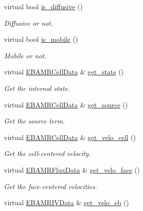 \begin{DoxyCompactItemize}
virtual bool \hyperlink{classcdr__solver_acf2ac6035a00fd145b42ef6565a3a4bb}{is\+\_\+diffusive} ()
\begin{DoxyCompactList}\small\item\em Diffusive or not. \end{DoxyCompactList}\item 
virtual bool \hyperlink{classcdr__solver_ad3e6c13db2bc4681d074112ef59542bf}{is\+\_\+mobile} ()
\begin{DoxyCompactList}\small\item\em Mobile or not. \end{DoxyCompactList}\item 
virtual \hyperlink{type__definitions_8H_a7e610f301989e5e07781c5e338bdb7c3}{E\+B\+A\+M\+R\+Cell\+Data} \& \hyperlink{classcdr__solver_a1e7f6087068cba769fdbe046639ee9ca}{get\+\_\+state} ()
\begin{DoxyCompactList}\small\item\em Get the internal state. \end{DoxyCompactList}\item 
virtual \hyperlink{type__definitions_8H_a7e610f301989e5e07781c5e338bdb7c3}{E\+B\+A\+M\+R\+Cell\+Data} \& \hyperlink{classcdr__solver_ad85c3e1065c64bc3d75007a738ea27a3}{get\+\_\+source} ()
\begin{DoxyCompactList}\small\item\em Get the source term. \end{DoxyCompactList}\item 
virtual \hyperlink{type__definitions_8H_a7e610f301989e5e07781c5e338bdb7c3}{E\+B\+A\+M\+R\+Cell\+Data} \& \hyperlink{classcdr__solver_ab7532eef4d59817755aa26be061494ac}{get\+\_\+velo\+\_\+cell} ()
\begin{DoxyCompactList}\small\item\em Get the cell-\/centered velocity. \end{DoxyCompactList}\item 
virtual \hyperlink{type__definitions_8H_aadad278b2e5d3d4abcf9032f90ba78c3}{E\+B\+A\+M\+R\+Flux\+Data} \& \hyperlink{classcdr__solver_a5b054a15eff4d09dded50f579d350086}{get\+\_\+velo\+\_\+face} ()
\begin{DoxyCompactList}\small\item\em Get the face-\/centered velocities. \end{DoxyCompactList}\item 
virtual \hyperlink{type__definitions_8H_a6b8fa905d55cbb491b52180386f0e0c1}{E\+B\+A\+M\+R\+I\+V\+Data} \& \hyperlink{classcdr__solver_a5027ab9f34147504640a002478fd6e0d}{get\+\_\+velo\+\_\+eb} ()

\end{DoxyCompactItemize}
